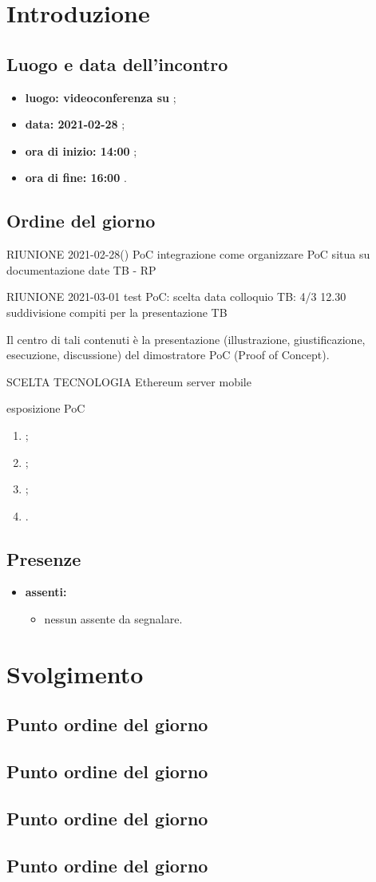\section*{Introduzione}
\subsection*{Luogo e data dell'incontro}
\begin{itemize}
	\item \textbf{luogo: videoconferenza su } ;
	\item \textbf{data: 2021-02-28} ;
	\item \textbf{ora di inizio: 14:00} ;
	\item \textbf{ora di fine: 16:00} .
\end{itemize}

\subsection*{Ordine del giorno}
RIUNIONE 2021-02-28()
PoC integrazione
come organizzare PoC
situa su documentazione
date TB - RP

RIUNIONE 2021-03-01
test PoC:
scelta data colloquio TB: 4/3 12.30
suddivisione compiti per la presentazione TB

Il centro di tali contenuti è la presentazione (illustrazione, giustificazione, esecuzione, discussione) del dimostratore PoC (Proof of Concept).

SCELTA TECNOLOGIA
Ethereum
server
mobile

esposizione PoC
\begin{enumerate}
	\item ;
	\item ;
	\item ;
	\item .
\end{enumerate}

\subsection*{Presenze}
\begin{itemize}
	\item \textbf{assenti:}
	\begin{itemize}
		\item nessun assente da segnalare.
	\end{itemize}
\end{itemize}

\section*{Svolgimento}
\subsection*{Punto ordine del giorno}
\subsection*{Punto ordine del giorno}
\subsection*{Punto ordine del giorno}
\subsection*{Punto ordine del giorno}
